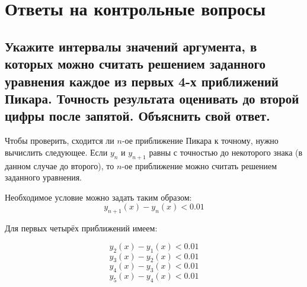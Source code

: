 \section{Ответы на контрольные вопросы}

\subsection{Укажите интервалы значений аргумента, в которых можно считать решением заданного уравнения каждое из первых 4-х  приближений Пикара. Точность результата оценивать до второй цифры после запятой. Объяснить свой ответ.}

Чтобы проверить, сходится ли $n$-ое приближение Пикара к точному, нужно вычислить следующее. Если $y_n$ и $y_{n+1}$ равны с точностью до некоторого знака (в данном случае до второго), то $n$-ое приближение можно считать решением заданного уравнения.

Необходимое условие можно задать таким образом:
\begin{equation*}
    y_{n + 1}(x) - y_{n}(x) < 0.01
\end{equation*}

Для первых четырёх приближений имеем:

\begin{equation}\label{eq:picard1}
    y_2(x) - y_1(x) < 0.01
\end{equation}
\begin{equation}\label{eq:picard2}
    y_3(x) - y_2(x) < 0.01
\end{equation}
\begin{equation}\label{eq:picard3}
    y_4(x) - y_3(x) < 0.01
\end{equation}
\begin{equation}\label{eq:picard4}
    y_5(x) - y_4(x) < 0.01
\end{equation}

